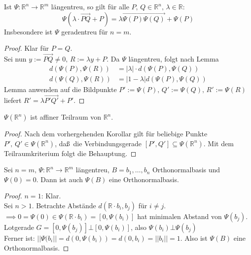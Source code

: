 \documentclass[parskip,a4paper,twoside,DIV15,BCOR12mm]{scrbook}
\begin{document}
\begin{corollary}
Ist \(\Psi:\mathbb{R}^{n}\to\mathbb{R}^{m}\) l\"angentreu, so gilt f\"ur alle
\(P,\,Q\in\mathbb{R}^{n},\,\lambda\in\mathbb{R}\):
\[
\Psi(\lambda\cdot\overrightarrow{PQ}+P)=\lambda\overrightarrow{\Psi(P)\Psi(Q)}+\Psi(P)
\]
Insbesondere ist \(\Psi\) geradentreu f\"ur \(n=m\).
\end{corollary}
\begin{proof}
Klar f\"ur \(P=Q\).\\
Sei nun \(y:=\overrightarrow{PQ}\neq 0,\,R:=\lambda y+P\). Da \(\Psi\) 
l\"angentreu, folgt nach Lemma
\begin{align*}
d(\Psi(P),\Psi(R))&=|\lambda|\cdot d(\Psi(P),\Psi(Q))\\
d(\Psi(Q),\Psi(R))&=|1-\lambda|d(\Psi(P),\Psi(Q))
\end{align*}
Lemma anwenden auf die Bildpunkte \(P':=\Psi(P),\,Q':=\Psi(Q),\,R':=\Psi(R)\)
liefert \(R'=\lambda\overrightarrow{P'Q'}+P'\).
\end{proof}

\begin{corollary}
\(\Psi(\mathbb{R}^{n})\) ist affiner Teilraum von \(\mathbb{R}^{n}\).
\end{corollary}
\begin{proof}
Nach dem vorhergehenden Korollar gilt f\"ur beliebige Punkte 
\(P',\,Q'\in\Psi(\mathbb{R}^{n})\), da\ss \ die Verbindungsgerade
\([P',Q']\subseteq\Psi(\mathbb{R}^{n})\).
Mit dem Teilraumkriterium folgt die Behauptung.
\end{proof}

\begin{corollary}
Sei \(n=m,\,\Psi:\mathbb{R}^{n}\to\mathbb{R}^{m}\) l\"angentreu, 
\(B={b_{1},\ldots,b_{n}}\) Orthonormalbasis und \(\Psi(0)=0\). Dann ist auch
\(\Psi(B)\) eine Orthonormalbasis.
\end{corollary}
\begin{proof}
\(n=1\): Klar.\\
Sei \(n>1\). Betrachte Abst\"ande \(d(\mathbb{R}\cdot b_{i},{b_{j}})\) f\"ur
\(i\neq j\).\\
\(\implies 0=\Psi(0)\in\Psi(\mathbb{R}\cdot b_{i})=[0,\Psi(b_{i})]\) hat 
minimalen Abstand von \(\Psi(b_{j})\).\\
Lotgerade \(G=[0,\Psi(b_{j})]\bot[0,\Psi(b_{i})]\), also \(\Psi(b_{i})\bot\Psi(b_{j})\)\\
Ferner ist: \(||\Psi(b_{i}||=d(0,\Psi(b_{i}))=d(0,b_{i})=||b_{i}||=1\).
Also ist \(\Psi(B)\) eine Orthonormalbasis.
\end{proof}
\end{document}
